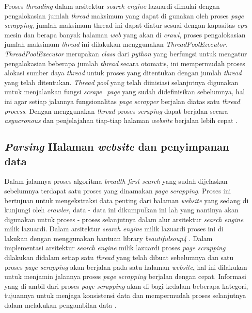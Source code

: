 Proses \emph{threading} dalam arsitektur \emph{search engine} lazuardi dimulai dengan pengalokasian jumlah \emph{thread} maksimum yang dapat di gunakan oleh proses \emph{page scrapping}, jumlah maksimum thread ini dapat diatur sesuai dengan kapasitas \emph{cpu} mesin dan berapa banyak halaman \emph{web} yang akan di \emph{crawl}, proses pengalokasian jumlah maksimum \emph{thread} ini dilakukan menggunakan \emph{ThreadPoolExecutor}. \emph{ThreadPoolExecutor} merupakan \emph{class} dari \emph{python} yang berfungsi untuk mengatur pengalokasian beberapa jumlah \emph{thread} secara otomatis, ini mempermudah proses alokasi sumber daya \emph{thread} untuk proses yang ditentukan dengan jumlah \emph{thread} yang telah ditentukan. \emph{Thread pool} yang telah diinisiasi selanjutnya digunakan untuk menjalankan fungsi \emph{scrape\_page} yang sudah didefinisikan sebelumnya, hal ini agar setiap jalannya fungsionalitas \emph{page scrapper} berjalan diatas satu \emph{thread process}. Dengan menggunakan \emph{thread} proses \emph{scraping} dapat berjalan secara \emph{asyncronous} dan penjelajahan tiap-tiap halaman \emph{website} berjalan lebih cepat \citep{lazuardithesis}.

\subsection{\emph{Parsing} Halaman \emph{website} dan penyimpanan data}

Dalam jalannya proses algoritma \emph{breadth first search} yang sudah dijelaskan sebelumnya terdapat satu proses yang dinamakan \emph{page scrapping}. Proses ini bertujuan untuk mengekstraksi data penting dari halaman \emph{website} yang sedang di kunjungi oleh \emph{crawler}, data - data ini dikumpulkan ini lah yang nantinya akan digunakan untuk proses - proses selanjutnya dalam alur arsitektur \emph{search engine} milik lazuardi. Dalam arsitektur \emph{search engine} milik lazuardi proses ini di lakukan dengan menggunakan bantuan library \emph{beautifulsoup4} \citep{lazuardithesis}. Dalam implementasi arsitektur \emph{search engine} milik lazuardi proses \emph{page scrapping} dilakukan didalam setiap satu \emph{thread} yang telah dibuat sebelumnya dan satu proses \emph{page scrapping} akan berjalan pada satu halaman \emph{website}, hal ini dilakukan untuk menjamin jalannya proses \emph{page scrapping} berjalan dengan cepat. Informasi yang di ambil dari proses \emph{page scrapping} akan di bagi kedalam beberapa kategori, tujuannya untuk menjaga konsistensi data dan mempermudah proses selanjutnya dalam melakukan pengambilan data \citep{lazuardithesis}.

